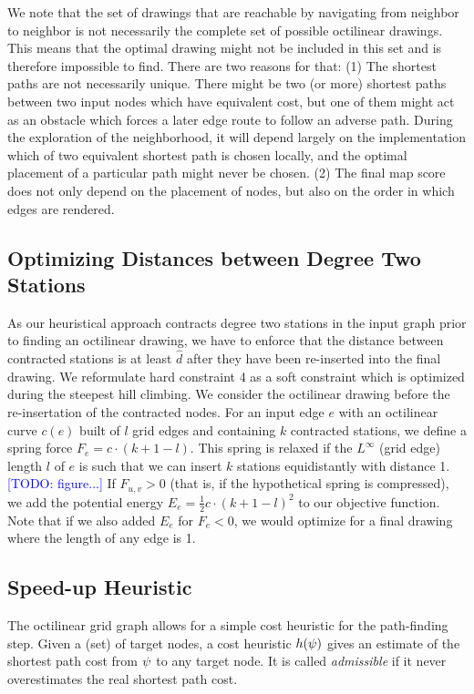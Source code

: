 \documentclass[sigconf]{acmart}
\newcommand\TODO[1]{\textcolor{blue}{\small [TODO: #1]}}
\begin{document}
We note that the set of drawings that are reachable by navigating from neighbor to neighbor is not necessarily the complete set of possible octilinear drawings.
This means that the optimal drawing might not be included in this set and is therefore impossible to find.
There are two reasons for that: 
(1) The shortest paths are not necessarily unique.
There might be two (or more) shortest paths between two input nodes which have equivalent cost, but one of them might act as an obstacle which forces a later edge route to follow an adverse path.
During the exploration of the neighborhood, it will depend largely on the implementation which of two equivalent shortest path is chosen locally, and the optimal placement of a particular path might never be chosen.
(2) The final map score does not only depend on the placement of nodes, but also on the order in which edges are rendered.

\subsection{Optimizing Distances between Degree Two Stations}

As our heuristical approach contracts degree two stations in the input graph prior to finding an octilinear drawing, we have to enforce that the distance between contracted stations is at least $\hat d$ after they have been re-inserted into the final drawing. 
We reformulate hard constraint 4 as a soft constraint which is optimized during the steepest hill climbing.
We consider the octilinear drawing before the re-insertation of the contracted nodes.
For an input edge $e$ with an octilinear curve $c(e)$ built of $l$ grid edges and containing $k$ contracted stations, we define a spring force $F_e = c \cdot (k + 1 - l)$.
This spring is relaxed if the $L^\infty$ (grid edge) length $l$ of $e$ is such that we can insert $k$ stations equidistantly with distance 1. \TODO{figure...}
If $F_{u, v} > 0$ (that is, if the hypothetical spring is compressed), we add the potential energy $E_e = \frac{1}{2} c \cdot (k + 1 - l)^2$ to our objective function.
Note that if we also added $E_e$ for $F_e < 0$, we would optimize for a final drawing where the length of any edge is 1.

\subsection{Speed-up Heuristic}

The octilinear grid graph allows for a simple cost heuristic for the path-finding step.
Given a (set) of target nodes, a cost heuristic $h(\psi)$ gives an estimate of the shortest path cost from $\psi$ to any target node.
It is called \emph{admissible} if it never overestimates the real shortest path cost.
\end{document}
